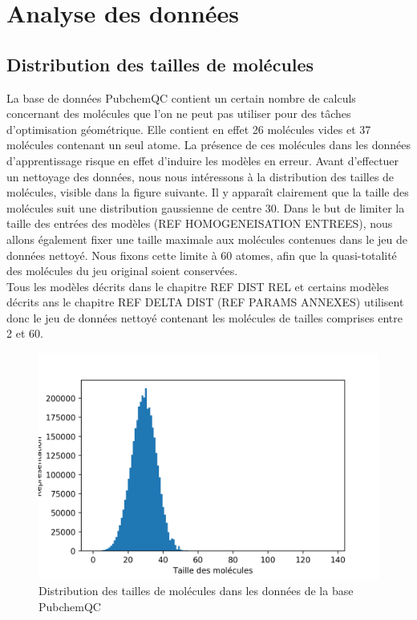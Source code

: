\section{Analyse des données}

\subsection{Distribution des tailles de molécules}

\par La base de données PubchemQC contient un certain nombre de calculs concernant des molécules que l'on ne peut pas utiliser pour des tâches d'optimisation géométrique. Elle contient en effet 26 molécules vides et 37 molécules contenant un seul atome. La présence de ces molécules dans les données d'apprentissage risque en effet d'induire les modèles en erreur.  Avant d'effectuer un nettoyage des données, nous nous intéressons à la distribution des tailles de molécules, visible dans la figure suivante. Il y apparaît clairement que la taille des molécules suit une distribution gaussienne de centre 30. Dans le but de limiter la taille des entrées des modèles (REF HOMOGENEISATION ENTREES), nous allons également fixer une taille maximale aux molécules contenues dans le jeu de données nettoyé. Nous fixons cette limite à 60 atomes, afin que la quasi-totalité des molécules du jeu original soient conservées.\\
Tous les modèles décrits dans le chapitre REF DIST REL et certains modèles décrits ans le chapitre REF DELTA DIST (REF PARAMS ANNEXES) utilisent donc le jeu de données nettoyé contenant les molécules de tailles comprises entre 2 et 60.

\begin{figure}[!h]
	\centering
	\includegraphics[scale=0.8]{../figures/80_distribution_molecules.png}
	\caption{Distribution des tailles de molécules dans les données de la base PubchemQC}
\end{figure}

